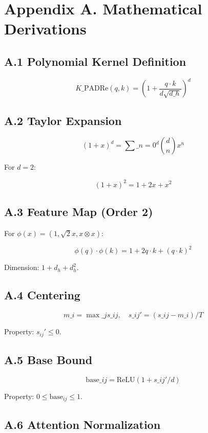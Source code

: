 \section{Appendix A. Mathematical Derivations}

\subsection{A.1 Polynomial Kernel Definition}

\[
K\_\text{PADRe}(q, k) = \left(1 + \frac{q \cdot k}{d \sqrt{d\_h}}\right)^d
\tag{A.1}
\]

\subsection{A.2 Taylor Expansion}

\[
(1 + x)^d = \sum\_{n=0}^{d} \binom{d}{n} x^n
\tag{A.2}
\]

For $d = 2$:

\[
(1 + x)^2 = 1 + 2x + x^2
\tag{A.3}
\]

\subsection{A.3 Feature Map (Order 2)}

For $\phi(x) = (1, \sqrt{2} x, x \otimes x)$:

\[
\phi(q) \cdot \phi(k) = 1 + 2 q \cdot k + (q \cdot k)^2
\tag{A.4}
\]

Dimension: $1 + d_h + d_h^2$.

\subsection{A.4 Centering}

\[
m\_i = \max\_j s\_{ij}, \quad s\_{ij}' = (s\_{ij} - m\_i)/T
\tag{A.5}
\]

Property: $s_{ij}' \leq 0$.

\subsection{A.5 Base Bound}

\[
\text{base}\_{ij} = \text{ReLU}(1 + s\_{ij}'/d)
\tag{A.6}
\]

Property: $0 \leq \text{base}_{ij} \leq 1$.

\subsection{A.6 Attention Normalization}

